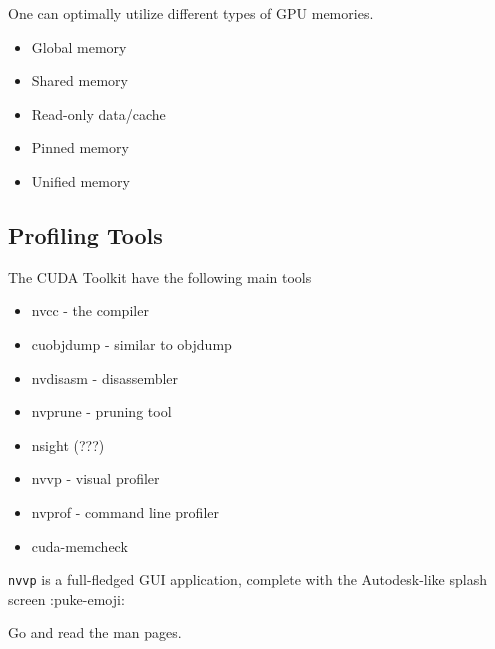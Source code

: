 One can optimally utilize different types of GPU memories.
\begin{itemize}
    \item Global memory
    \item Shared memory
    \item Read-only data/cache
    \item Pinned memory
    \item Unified memory
\end{itemize}

\subsection*{Profiling Tools}
The CUDA Toolkit have the following main tools
\begin{itemize}
    \item nvcc - the compiler
    \item cuobjdump - similar to objdump
    \item nvdisasm - disassembler
    \item nvprune - pruning tool
    \item nsight (???)
    \item nvvp - visual profiler
    \item nvprof - command line profiler
    \item cuda-memcheck
\end{itemize}

\texttt{nvvp} is a full-fledged GUI application, complete with the
Autodesk-like splash screen :puke-emoji:

Go and read the man pages.



